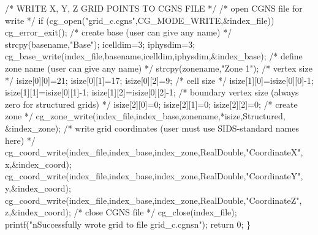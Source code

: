 \documentclass[12pt]{article}
\begin{document}
{\noindent /*  WRITE X, Y, Z GRID POINTS TO CGNS FILE  */
\newline /*  open CGNS file for write  */
\newline\indent  if (cg\_open("grid\_c.cgns",CG\_MODE\_WRITE,\&index\_file)) cg\_error\_exit();
\newline /*  create base (user can give any name)  */
\newline\indent  strcpy(basename,"Base");
\newline\indent  icelldim=3;
\newline\indent  iphysdim=3;
\newline\indent  cg\_base\_write(index\_file,basename,icelldim,iphysdim,\&index\_base);
\newline /*  define zone name (user can give any name)  */
\newline\indent  strcpy(zonename,"Zone  1");
\newline /*  vertex size  */
\newline\indent  isize[0][0]=21;
\newline\indent  isize[0][1]=17;
\newline\indent  isize[0][2]=9;
\newline /*  cell size  */
\newline\indent  isize[1][0]=isize[0][0]-1;
\newline\indent  isize[1][1]=isize[0][1]-1;
\newline\indent  isize[1][2]=isize[0][2]-1;
\newline /*  boundary vertex size (always zero for structured grids)  */
\newline\indent  isize[2][0]=0;
\newline\indent  isize[2][1]=0;
\newline\indent  isize[2][2]=0;
\newline /*  create zone  */
\newline\indent  cg\_zone\_write(index\_file,index\_base,zonename,*isize,Structured,
\newline \indent \indent \&index\_zone);
\newline /*  write grid coordinates (user must use SIDS-standard names here)  */
\newline\indent  cg\_coord\_write(index\_file,index\_base,index\_zone,RealDouble,"CoordinateX",
\newline \indent \indent x,\&index\_coord);
\newline\indent  cg\_coord\_write(index\_file,index\_base,index\_zone,RealDouble,"CoordinateY",
\newline \indent \indent y,\&index\_coord);
\newline\indent  cg\_coord\_write(index\_file,index\_base,index\_zone,RealDouble,"CoordinateZ",
\newline \indent \indent z,\&index\_coord);
\newline /*  close CGNS file  */
\newline\indent  cg\_close(index\_file);
\newline\indent printf("\texttt{}nSuccessfully wrote grid to file grid\_c.cgns\texttt{}n");
\newline\indent return 0;
\newline\}
}
\end{document}
